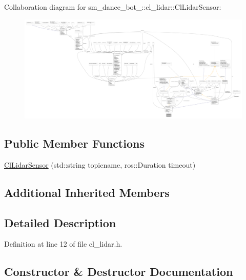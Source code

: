 Collaboration diagram for sm\+\_\+dance\+\_\+bot\+\_\+:\+:cl\+\_\+lidar\+:\+:Cl\+Lidar\+Sensor\+:
\nopagebreak
\begin{figure}[H]
\begin{center}
\leavevmode
\includegraphics[width=350pt]{classsm__dance__bot__3_1_1cl__lidar_1_1ClLidarSensor__coll__graph}
\end{center}
\end{figure}
\subsection*{Public Member Functions}
\begin{DoxyCompactItemize}
\item 
\hyperlink{classsm__dance__bot__3_1_1cl__lidar_1_1ClLidarSensor_a00497caab2dfa3fc00fa2ffbdbc8a803}{Cl\+Lidar\+Sensor} (std\+::string topicname, ros\+::\+Duration timeout)
\end{DoxyCompactItemize}
\subsection*{Additional Inherited Members}


\subsection{Detailed Description}


Definition at line 12 of file cl\+\_\+lidar.\+h.



\subsection{Constructor \& Destructor Documentation}
